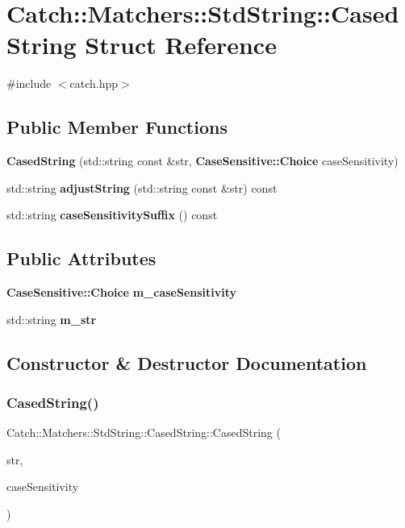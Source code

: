 \section{Catch\+:\+:Matchers\+:\+:Std\+String\+:\+:Cased\+String Struct Reference}
\label{struct_catch_1_1_matchers_1_1_std_string_1_1_cased_string}


{\ttfamily \#include $<$catch.\+hpp$>$}

\subsection*{Public Member Functions}
\begin{DoxyCompactItemize}
\item 
\textbf{ Cased\+String} (std\+::string const \&str, \textbf{ Case\+Sensitive\+::\+Choice} case\+Sensitivity)
\item 
std\+::string \textbf{ adjust\+String} (std\+::string const \&str) const
\item 
std\+::string \textbf{ case\+Sensitivity\+Suffix} () const
\end{DoxyCompactItemize}
\subsection*{Public Attributes}
\begin{DoxyCompactItemize}
\item 
\textbf{ Case\+Sensitive\+::\+Choice} \textbf{ m\+\_\+case\+Sensitivity}
\item 
std\+::string \textbf{ m\+\_\+str}
\end{DoxyCompactItemize}


\subsection{Constructor \& Destructor Documentation}
\mbox{\label{struct_catch_1_1_matchers_1_1_std_string_1_1_cased_string_aa88bbc5acd2bff22351d8d4b1816b561}} 
\subsubsection{Cased\+String()}
{\footnotesize\ttfamily Catch\+::\+Matchers\+::\+Std\+String\+::\+Cased\+String\+::\+Cased\+String (\begin{DoxyParamCaption}\item[{std\+::string const \&}]{str,  }\item[{\textbf{ Case\+Sensitive\+::\+Choice}}]{case\+Sensitivity }\end{DoxyParamCaption})}



